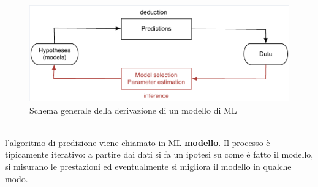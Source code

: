 \documentclass[12pt, oneside]{extbook}
\begin{document}
\begin{figure}[!h]
	\includegraphics[scale=0.5]{immagini/schema-modello.png}
	\caption{Schema generale della derivazione di un modello di ML}
\end{figure}\\
l'algoritmo di predizione viene chiamato in ML \textbf{modello}. Il processo è tipicamente iterativo: a partire dai dati si fa un ipotesi su come è fatto il modello, si misurano le prestazioni ed eventualmente si migliora il modello in qualche modo.\\\\
\end{document}
